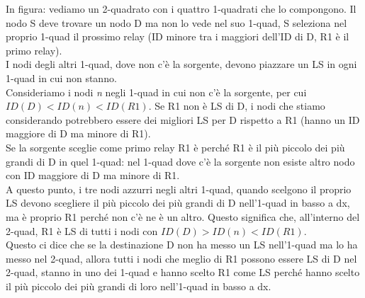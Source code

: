 \documentclass[12pt,italian]{report}
\begin{document}
\noindent In figura: vediamo un 2-quadrato con i quattro 1-quadrati che lo compongono. Il nodo S deve trovare un nodo D ma non lo vede nel suo 1-quad, S seleziona nel proprio 1-quad il prossimo relay (ID minore tra i maggiori dell'ID di D, R1 è il primo relay). \\ I nodi degli altri 1-quad, dove non c'è la sorgente, devono piazzare un LS in ogni 1-quad in cui non stanno. \\ Consideriamo i nodi \textit{n} negli 1-quad in cui non c'è la sorgente, per cui $ID(D) < ID(n) < ID(R1)$. Se R1 non è LS di D, i nodi che stiamo considerando potrebbero essere dei migliori LS per D rispetto a R1 (hanno un ID maggiore di D ma minore di R1). \\ Se la sorgente sceglie come primo relay R1 è perché R1 è il più piccolo dei più grandi di D in quel 1-quad: nel 1-quad dove c'è la sorgente non esiste altro nodo con ID maggiore di D ma minore di R1. \\ A questo punto, i tre nodi azzurri negli altri 1-quad, quando scelgono il proprio LS devono scegliere il più piccolo dei più grandi di D nell'1-quad in basso a dx, ma è proprio R1 perché non c'è ne è un altro. Questo significa che, all'interno del 2-quad, R1 è LS di tutti i nodi con $ID(D) > ID(n) < ID(R1)$. \\ Questo ci dice che se la destinazione D non ha messo un LS nell'1-quad ma lo ha messo nel 2-quad, allora tutti i nodi che meglio di R1 possono essere LS di D nel 2-quad, stanno in uno dei 1-quad e hanno scelto R1 come LS perché hanno scelto il più piccolo dei più grandi di loro nell'1-quad in basso a dx.
\end{document}
